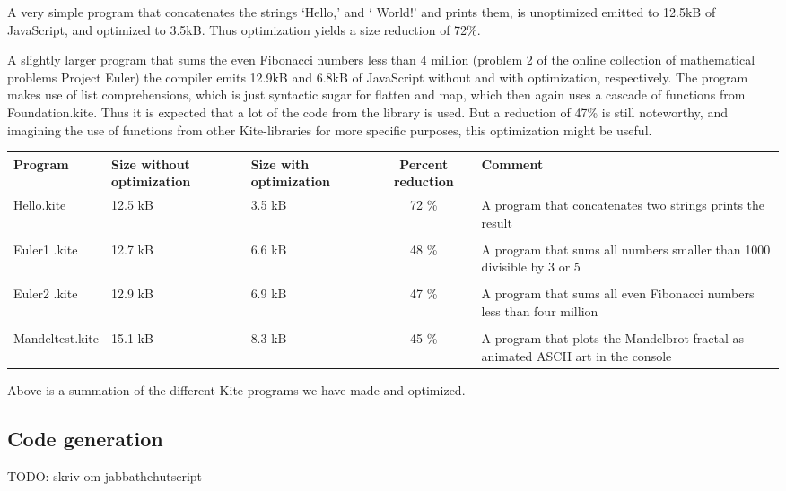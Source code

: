 A very simple program that concatenates the strings `Hello,' and ` World!' and prints them, is unoptimized emitted to 12.5kB of JavaScript, and optimized to 3.5kB. Thus optimization yields a size reduction of 72\%.

A slightly larger program that sums the even Fibonacci numbers less than 4 million (problem 2 of the online collection of mathematical problems Project Euler\cite{euler}) the compiler emits 12.9kB and 6.8kB of JavaScript without and with optimization, respectively. The program makes use of list comprehensions, which is just syntactic sugar for flatten and map, which then again uses a cascade of functions from Foundation.kite. Thus it is expected that a lot of the code from the library is used. But a reduction of 47\% is still noteworthy, and imagining the use of functions from other Kite-libraries for more specific purposes, this optimization might be useful.

\begin{center}
  \begin{tabulary}{0.9\textwidth}{|L| L |L| C | L | }
    \hline
    Program & Size without optimization & Size with optimization & Percent reduction & Comment \\
    \hline
    Hello.kite       & 12.5 kB & 3.5 kB & 72 \% & A program that concatenates two strings prints the result \\
    & & & & \\
    Euler1 .kite       & 12.7 kB & 6.6 kB & 48 \% & A program that sums all numbers smaller than 1000 divisible by 3 or 5 \\
    & & & & \\
    Euler2 .kite       & 12.9 kB & 6.9 kB & 47 \% & A program that sums all even Fibonacci numbers less than four million \\
    & & & & \\
    Mandeltest.kite       & 15.1 kB & 8.3 kB & 45 \% & A program that plots the Mandelbrot fractal as animated ASCII art in the console\\
    \hline
  \end{tabulary}

  Above is a summation of the different Kite-programs we have made and optimized.
\end{center}


\subsection{Code generation}
TODO: skriv om jabbathehutscript
